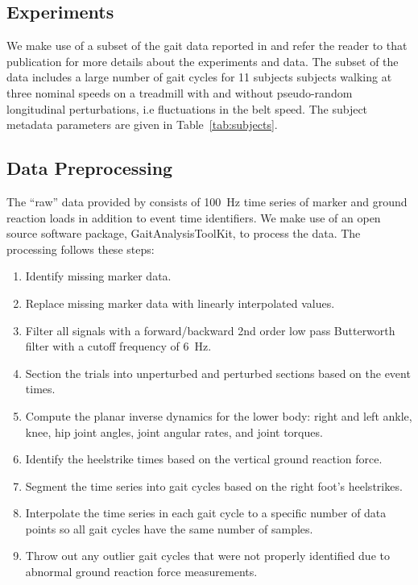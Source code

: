 \documentclass{article}
\begin{document}
\subsection*{Experiments}
%
We make use of a subset of the gait data reported in \cite{Moore2015} and refer
the reader to that publication for more details about the experiments and data.
The subset of the data includes a large number of gait cycles for 11 subjects
subjects walking at three nominal speeds on a treadmill with and without
pseudo-random longitudinal perturbations, i.e fluctuations in the belt speed.
The subject metadata parameters are given in Table~\ref{tab:subjects}.
%
\begin{table}
  \cprotect\caption{Information about the 11 study participants. The final
    three columns provide the trial numbers associated with each nominal
    treadmill speed. The measured mass is computed from the mean total vertical
    ground reaction force just after the calibration pose event. Generated by
    \verb|src/subject_table.py|.}
  \centering
  
  \label{tab:subjects}
\end{table}

\subsection*{Data Preprocessing}
%
The ``raw'' data provided by \cite{Moore2015} consists of 100~\si{\hertz} time
series of marker and ground reaction loads in addition to event time
identifiers. We make use of an open source software package,
GaitAnalysisToolKit, to process the data. The processing follows these steps:
%
\begin{enumerate}
  \item Identify missing marker data.
  \item Replace missing marker data with linearly interpolated values.
  \item Filter all signals with a forward/backward 2nd order low pass
    Butterworth filter with a cutoff frequency of 6~\si{\hertz}.
  \item Section the trials into unperturbed and perturbed sections based on the
    event times.
  \item Compute the planar inverse dynamics for the lower body: right and left
    ankle, knee, hip joint angles, joint angular rates, and joint torques.
  \item Identify the heelstrike times based on the vertical ground reaction
    force.
  \item Segment the time series into gait cycles based on the right foot's
    heelstrikes.
  \item Interpolate the time series in each gait cycle to a specific number of
    data points so all gait cycles have the same number of samples.
  \item Throw out any outlier gait cycles that were not properly identified due
    to abnormal ground reaction force measurements.
\end{enumerate}
\end{document}
